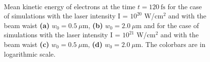 \begin{figure}[h!]
	\centering
	\\[2mm]
	\caption{Mean kinetic energy of electrons at the time $ t = 120 \ \mathrm{fs} $ for the case of simulations with the laser intensity I = $ 10^{20} $ W/cm$^2$ and with the beam waist \textbf{(a)} $ w_0 = 0.5 \ \mu\mathrm{m} $, \textbf{(b)} $ w_0 = 2.0 \ \mu\mathrm{m} $ and for the case of simulations with the laser intensity I = $ 10^{21} $ W/cm$^2$ and with the beam waist \textbf{(c)} $ w_0 = 0.5 \ \mu\mathrm{m} $, \textbf{(d)} $ w_0 = 2.0 \ \mu\mathrm{m} $. The colorbars are in logarithmic scale.}
	\label{fig:16}
\end{figure}


